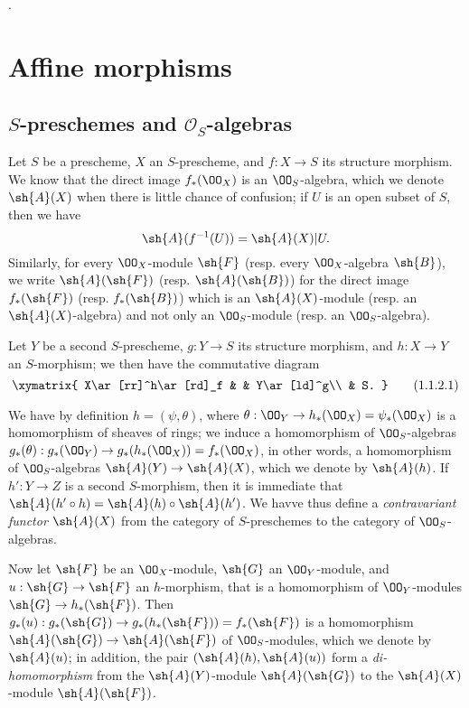 \cite{I-1}.

\section{Affine morphisms}
\label{section:affine-morphisms}

\subsection{$S$-preschemes and $\mathcal{O}_S$-algebras}
\label{subsection:s-preschemes-algebras}

\begin{env}[1.1.1]
\label{2.1.1.1}
Let $S$ be a prescheme, $X$ an $S$-prescheme, and $f:X\to S$ its structure morphism.
We know  that the direct image $f_*(\OO_X)$ is an $\OO_S$-algebra, which we
denote $\sh{A}(X)$ when there is little chance of confusion; if $U$ is an open subset of $S$, then we have
\[
  \sh{A}(f^{-1}(U))=\sh{A}(X)|U.
\]
Similarly, for every $\OO_X$-module $\sh{F}$ (resp. every $\OO_X$-algebra $\sh{B}$), we write $\sh{A}(\sh{F})$ (resp. $\sh{A}(\sh{B})$) for the direct image $f_*(\sh{F})$ (resp. $f_*(\sh{B})$) which is an $\sh{A}(X)$-module (resp. an $\sh{A}(X)$-algebra) and not only an $\OO_S$-module (resp. an $\OO_S$-algebra).
\end{env}

\begin{env}[1.1.2]
\label{2.1.1.2}
Let $Y$ be a second $S$-prescheme, $g:Y\to S$ its structure morphism, and $h:X\to Y$ an $S$-morphism; we then have the commutative diagram
\[
  \xymatrix{
    X\ar[rr]^h\ar[rd]_f & &
    Y\ar[ld]^g\\
    & S.
  }
  \tag{1.1.2.1}
\]

We have by definition $h=(\psi,\theta)$, where $\theta:\OO_Y\to h_*(\OO_X)=\psi_*(\OO_X)$ is a homomorphism of sheaves of rings; we induce  a homomorphism of $\OO_S$-algebras $g_*(\theta):g_*(\OO_Y)\to g_*(h_*(\OO_X))=f_*(\OO_X)$, in other words, a homomorphism of $\OO_S$-algebras $\sh{A}(Y)\to\sh{A}(X)$, which we denote by $\sh{A}(h)$.
If $h':Y\to Z$ is a second $S$-morphism, then it is immediate that $\sh{A}(h'\circ h)=\sh{A}(h)\circ\sh{A}(h')$.
We havve thus define a \emph{contravariant functor $\sh{A}(X)$} from the category of $S$-preschemes to the category of $\OO_S$-algebras.

Now let $\sh{F}$ be an $\OO_X$-module, $\sh{G}$ an $\OO_Y$-module, and $u:\sh{G}\to\sh{F}$ an $h$-morphism, that is  a homomorphism of $\OO_Y$-modules $\sh{G}\to h_*(\sh{F})$.
Then $g_*(u):g_*(\sh{G})\to g_*(h_*(\sh{F}))=f_*(\sh{F})$ is a homomorphism $\sh{A}(\sh{G})\to\sh{A}(\sh{F})$ of $\OO_S$-modules, which we denote by $\sh{A}(u)$; in addition, the pair $(\sh{A}(h),\sh{A}(u))$ form a \emph{di-homomorphism} from the $\sh{A}(Y)$-module $\sh{A}(\sh{G})$ to the $\sh{A}(X)$-module $\sh{A}(\sh{F})$.
\end{env}

